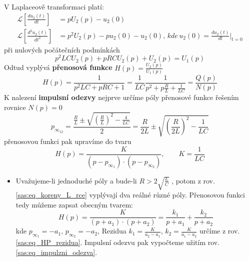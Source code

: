\begin{example}
\begin{equation}
    \end{equation}
    V Laplaceově transformaci platí:
    \begin{align*}
       \mathcal{L}\left[\frac{du_2(t)}{dt}\right]     &= pU_2(p)-u_2(0) \\
       \mathcal{L}\left[\frac{d^2u_2(t)}{dt^2}\right] &= p^2U_2(p)-pu_2(0)-u_2(0),\,kde\,u_2(0)=
                                                         \frac{du_2(t)}{dt}|_{t=0}
    \end{align*}
    při nulových počátečních podmínkách
    \begin{equation}\label{sas:eq_L_RLC_rce}
       p^2LCU_2(p)+pRCU_2(p)+U_2(p)=U_1(p)
    \end{equation}
    Odtud vyplývá \textbf{přenosová funkce} $H(p)=\frac{U_2(p)}{U_1(p)}$
    \begin{equation}\label{sas:eq_Hp_RLC}
       H(p)=\frac{1}{p^2LC+pRC+1}
           =\frac{1}{LC}\frac{1}{p^2+p\frac{R}{L}+\frac{1}{LC}}=\frac{Q(p)}{N(p)}
    \end{equation}
    K nalezení \textbf{impulsní odezvy} nejprve určíme póly přenosové funkce řešením rovnice
    $N(p)=0$
    \begin{equation}\label{sas:eq_koreny_L_rce}
       p_{\infty_{12}}=\frac{\frac{R}{L}\pm\sqrt{\left(\frac{R}{L}\right)^2-\frac{4}{LC}}}{2}
                      =\frac{R}{2L}\pm\sqrt{\left(\frac{R}{2L}\right)^2-\frac{1}{LC}}
    \end{equation}
    přenosovou funkci pak upravíme do tvaru
    \begin{equation}\label{sas:eq_Hp_forma}
       H(p)=\frac{K}{(p-p_{\infty_1})\cdot(p-p_{\infty_2})}, \qquad K=\frac{1}{LC}
    \end{equation}
    \begin{itemize}
      \item Uvažujeme-li jednoduché póly a bude-li $R>2\sqrt{\frac{L}{C}}$ , potom z  rov.
            \ref{sas:eq_koreny_L_rce} vyplývají dva reálné různé póly. Přenosovou funkci tedy můžeme
            zapsat obecným tvarem:
            \begin{equation}\label{sas:eq_Hp_forma_2}
              H(p)=\frac{K}{(p+a_1)\cdot(p+a_2)}=\frac{k_1}{p+a_1}+\frac{k_2}{p+a_2}
            \end{equation}
            kde $p_{\infty_1}=-a_1,\, p_{\infty_2}=-a_2$, Rezidua  $k_1=\frac{K}{a_2-a_1}$,
            $k_2=\frac{K}{a_1-a_2}$ určíme z rov. \ref{sas:eq_HP_rezidua}. Impulsní odezvu pak
            vypočteme užitím rov. \ref{sas:eq_impulzni_odezva}.
            \begin{equation}\label{sas:eq_ht1}

\end{equation}
\end{itemize}
\end{example}
